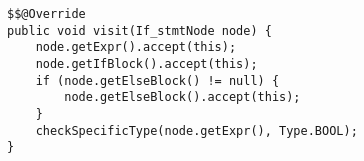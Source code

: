 \begin{lstlisting}[caption={Visit if statement node}, label={code:TC:if}]
$$@Override
public void visit(If_stmtNode node) {
    node.getExpr().accept(this);
    node.getIfBlock().accept(this);
    if (node.getElseBlock() != null) {
        node.getElseBlock().accept(this);
    }
    checkSpecificType(node.getExpr(), Type.BOOL);
}
\end{lstlisting}